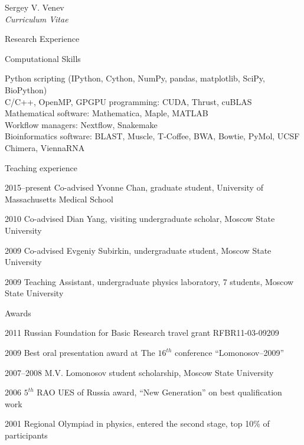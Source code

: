 \documentclass[10pt]{article}
\newenvironment{sublist}{%
    \begin{list}{}{%
        \setlength{\itemsep}{0em}\setlength{\parsep}{0em}%
        \setlength{\topsep}{0em}\setlength{\parskip}{0em}%
    }%
}%
{ \end{list} }
\begin{document}
\begin{cv}{Sergey V. Venev\\{\large \itshape Curriculum Vitae}}
\begin{cvlist}{Research Experience}
\end{cvlist}
\setlength{\cvlabelwidth}{\oldcvlabelwidth}



\setlength{\oldcvlabelwidth}{\cvlabelwidth}
\setlength{\cvlabelwidth}{1em}
\begin{cvlist}{Computational Skills}
        \item Python scripting (IPython, Cython, NumPy, pandas, matplotlib, SciPy, BioPython)\\
        C/C++, OpenMP, GPGPU programming: CUDA, Thrust, cuBLAS\\
        Mathematical software: Mathematica, Maple, MATLAB\\
        Workflow managers: Nextflow, Snakemake\\
        Bioinformatics software: BLAST, Muscle, T-Coffee, BWA, Bowtie, PyMol, UCSF Chimera, ViennaRNA
\end{cvlist}
\setlength{\cvlabelwidth}{\oldcvlabelwidth}




\setlength{\oldcvlabelwidth}{\cvlabelwidth}
\setlength{\cvlabelwidth}{1em}
\begin{cvlist}{Teaching experience}
        \item[2015--present] Co-advised Yvonne Chan, graduate student, University of Massachusetts Medical School
        \item[2010] Co-advised Dian Yang, visiting undergraduate scholar, Moscow State University
        \item[2009] Co-advised Evgeniy Subirkin, undergraduate student, Moscow State University
        \item[2009] Teaching Assistant, undergraduate physics laboratory, 7 students, Moscow State University
\end{cvlist}
\setlength{\cvlabelwidth}{\oldcvlabelwidth}



\begin{cvlist}{Awards}
    \item[2011] Russian Foundation for Basic Research travel grant RFBR11-03-09209  
    \item[2009] Best oral presentation award at The $16^{th}$ conference ``Lomonosov--2009''  
    \item[2007--2008] M.V. Lomonosov student scholarship, Moscow State University  
    \item[2006] $5^{th}$ RAO UES of Russia award, ``New Generation'' on best qualification work 
    \item[2001] Regional Olympiad in physics, entered the second stage, top 10\% of participants
\end{cvlist}



\end{cv}
\end{document}

